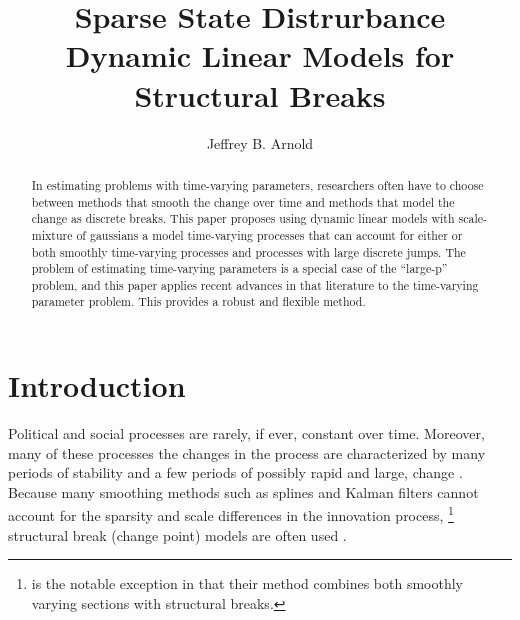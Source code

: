 \documentclass{article}
\author{Jeffrey B. Arnold}
\title{Sparse State Distrurbance Dynamic Linear Models for Structural Breaks}
\begin{document}
\maketitle{}

\begin{abstract}
  In estimating problems with time-varying parameters, researchers often have to choose between methods that smooth the change over time and methods that model the change as discrete breaks.
  This paper proposes using dynamic linear models with scale-mixture of gaussians a model time-varying processes that can account for either or both smoothly time-varying processes and processes with large discrete jumps.
  The problem of estimating time-varying parameters is a special case of the ``large-p'' problem, and this paper applies recent advances in that literature to the time-varying parameter problem.
  This provides a robust and flexible method. 
\end{abstract}

\section{Introduction}
\label{sec:introduction}

Political and social processes are rarely, if ever, constant over time. 
Moreover, many of these processes the changes in the process are characterized by many periods of stability and a few periods of possibly rapid and large, change \parencite{RatkovicEng2010}.
Because many smoothing methods such as splines and Kalman filters cannot account for the sparsity and scale differences in the innovation process,
\footnote{\textcite{RatkovicEng2010} is the notable exception in that their method combines both smoothly varying sections with structural breaks.}
structural break (change point) models are often used \parencites{CalderiaZorn1998}{Spirling2007}{Spirling2007a}{Park2010}{Park2011}.%
\end{document}
